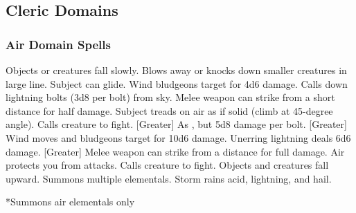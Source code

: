 \subsection{Cleric Domains}\label{Cleric Domains}

\begin{comment}
\subsubsection{Example Domain}
\parhead{Domain Power}
\parhead{Channelled Domain Power}
\parhead[Greate] Domain Power}
\parhead[Greate] Channelled Domain Power}
\parhead{Domain Mastery}
\begin{spelllist}
    \spellhead[1]{}
    \spellhead[1]{}
    \spellhead[2]{}
    \spellhead[2]{}
    \spellhead[3]{}
    \spellhead[3]{}
    \spellhead[4]{}
    \spellhead[4]{}
    \spellhead[5]{}
    \spellhead[5]{}
    \spellhead[6]{}
    \spellhead[6]{}
    \spellhead[7]{}
    \spellhead[7]{}
    \spellhead[8]{}
    \spellhead[8]{}
    \spellhead[9]{}
    \spellhead[9]{}
\end{spelllist}
\end{comment}

\subsubsection{Air Domain Spells}

\begin{spelllist}
     Objects or creatures fall slowly.
     Blows away or knocks down smaller creatures in large line.
     Subject can glide.
     Wind bludgeons target for 4d6 damage.
     Calls down lightning bolts (3d8 per bolt) from sky.
     Melee weapon can strike from a short distance for half damage.
     Subject treads on air as if solid (climb at 45-degree angle).
     Calls creature to fight.
    [Greater] As , but 5d8 damage per bolt.
    [Greater] Wind moves and bludgeons target for 10d6 damage.
     Unerring lightning deals 6d6 damage.
    [Greater] Melee weapon can strike from a distance for full damage.
     Air protects you from attacks. 
     Calls creature to fight.
     Objects and creatures fall upward.
     Summons multiple elementals.
     Storm rains acid, lightning, and hail.
\end{spelllist}
*Summons air elementals only


